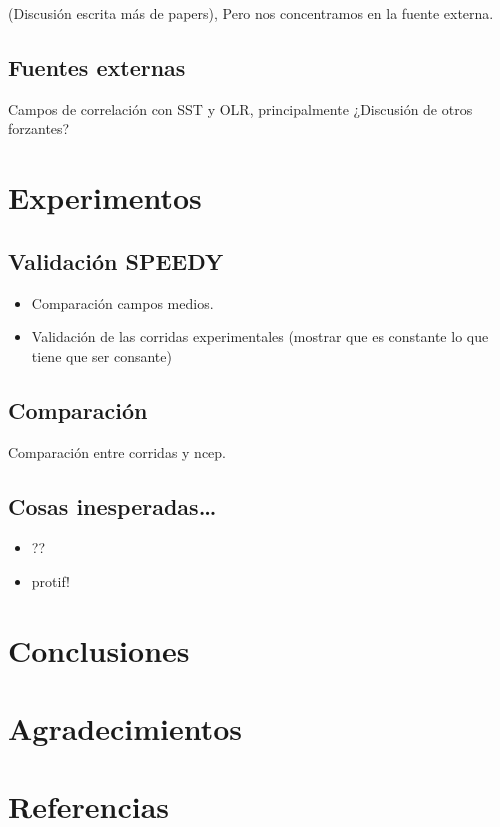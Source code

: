 \documentclass[spanish,a4paper]{book}
\providecommand{\tightlist}{%
  \setlength{\itemsep}{0pt}\setlength{\parskip}{0pt}}
\begin{document}
(Discusión escrita más de papers), Pero nos concentramos en la fuente
externa.

\section{Fuentes externas}\label{fuentes-externas}

Campos de correlación con SST y OLR, principalmente ¿Discusión de otros
forzantes?

\chapter{Experimentos}\label{experimentos}

\section{Validación SPEEDY}\label{validacion-speedy}

\begin{itemize}
\tightlist
\item
  Comparación campos medios.
\item
  Validación de las corridas experimentales (mostrar que es constante lo
  que tiene que ser consante)
\end{itemize}

\section{Comparación}\label{comparacion}

Comparación entre corridas y ncep.

\section{Cosas inesperadas\ldots{}}\label{cosas-inesperadas}

\begin{itemize}
\tightlist
\item
  ??
\item
  protif!
\end{itemize}

\chapter{Conclusiones}\label{conclusiones}

\chapter{Agradecimientos}\label{agradecimientos}

\chapter{Referencias}\label{referencias}
\end{document}
